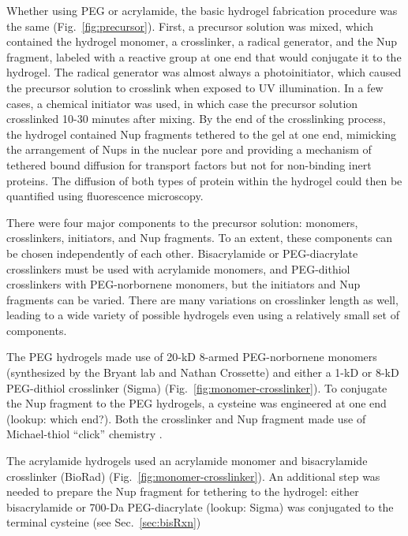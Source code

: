 Whether using PEG or acrylamide, the basic hydrogel fabrication procedure was the same (Fig.~\ref{fig:precursor}).  First, a precursor solution was mixed, which contained the hydrogel monomer, a crosslinker, a radical generator, and the Nup fragment, labeled with a reactive group at one end that would conjugate it to the hydrogel.  The radical generator was almost always a photoinitiator, which caused the precursor solution to crosslink when exposed to UV illumination.  In a few cases, a chemical initiator was used, in which case the precursor solution crosslinked 10-30 minutes after mixing.  By the end of the crosslinking process, the hydrogel contained Nup fragments tethered to the gel at one end, mimicking the arrangement of Nups in the nuclear pore and providing a mechanism of tethered bound diffusion for transport factors but not for non-binding inert proteins.  The diffusion of both types of protein within the hydrogel could then be quantified using fluorescence microscopy.

There were four major components to the precursor solution: monomers, crosslinkers, initiators, and Nup fragments.  To an extent, these components can be chosen independently of each other.  Bisacrylamide or PEG-diacrylate crosslinkers must be used with acrylamide monomers, and PEG-dithiol crosslinkers with PEG-norbornene monomers, but the initiators and Nup fragments can be varied.  There are many variations on crosslinker length as well, leading to a wide variety of possible hydrogels even using a relatively small set of components.

The PEG hydrogels made use of 20-kD 8-armed PEG-norbornene monomers (synthesized by the Bryant lab and Nathan Crossette) and either a 1-kD or 8-kD PEG-dithiol crosslinker (Sigma) (Fig.~\ref{fig:monomer-crosslinker}).  To conjugate the Nup fragment to the PEG hydrogels, a cysteine was engineered at one end (lookup: which end?).  Both the crosslinker and Nup fragment made use of Michael-thiol ``click'' chemistry \cite{chatani14}\cite{nair14}.

The acrylamide hydrogels used an acrylamide monomer and bisacrylamide crosslinker (BioRad) (Fig.~\ref{fig:monomer-crosslinker}).  An additional step was needed to prepare the Nup fragment for tethering to the hydrogel: either bisacrylamide or 700-Da PEG-diacrylate (lookup: Sigma) was conjugated to the terminal cysteine (see Sec.~\ref{sec:bisRxn})

